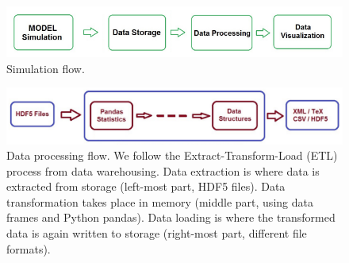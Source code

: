 \documentclass[10pt,a4paper]{article}
\begin{document}
\begin{figure}
\graphicspath{{./png/}}
%
\begin{boxedminipage}{14cm}
\centering\leavevmode
\includegraphics[scale=1]{simulation_workflow.pdf} 
\end{boxedminipage}
\label{Fig: Simulation workflow}
\caption{\footnotesize Simulation flow.}
\end{figure}

\begin{figure}
\centering\leavevmode
\graphicspath{{./png/}}
%
\begin{boxedminipage}{14cm}
\centering\leavevmode
\includegraphics[scale=.5]{data_processing.pdf} 
\end{boxedminipage}
\label{Fig: Data processing}
\caption{\footnotesize Data processing flow. We follow the Extract-Transform-Load (ETL) process from data warehousing. Data extraction is where data is extracted from storage (left-most part, HDF5 files). Data transformation takes place in memory (middle part, using data frames and Python pandas). Data loading is where the transformed data is again written to storage (right-most part, different file formats).}
\end{figure}
\end{document}
